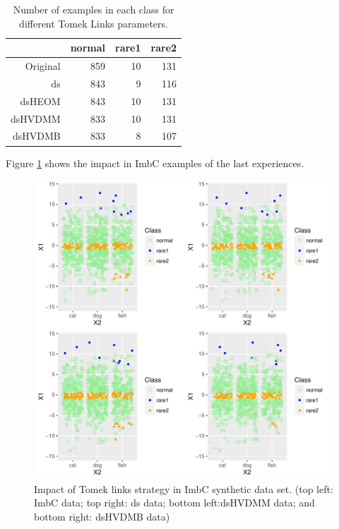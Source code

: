 \documentclass[10pt,a4paper]{article}\usepackage[]{graphicx}\usepackage[]{color}
\makeatletter
\def\maxwidth{ %
  \ifdim\Gin@nat@width>\linewidth
    \linewidth
  \else
    \Gin@nat@width
  \fi
}
\newenvironment{knitrout}{}{} %
\makeatother
\begin{document}
\begin{table}[ht]
\centering
\begin{tabular}{rrrr}
  \hline
 & normal & rare1 & rare2 \\ 
  \hline
Original & 859 &  10 & 131 \\ 
  ds & 843 &   9 & 116 \\ 
  dsHEOM & 843 &  10 & 131 \\ 
  dsHVDMM & 833 &  10 & 131 \\ 
  dsHVDMB & 833 &   8 & 107 \\ 
   \hline
\end{tabular}
\caption{Number of examples in each class for different Tomek Links parameters.} 
\label{tab:TL_table}
\end{table}



Figure \ref{fig:TL_difPar2} shows the impact in ImbC examples of the last experiences.
\begin{knitrout}\footnotesize
{}\color{fgcolor}\begin{figure}

{\centering \includegraphics[width=\maxwidth]{figures/UBL-TL_difPar2-1} 

}

\caption[Impact of Tomek links strategy in ImbC synthetic data set]{Impact of Tomek links strategy in ImbC synthetic data set. (top left: ImbC data; top right: ds data; bottom left:dsHVDMM data; and bottom right: dsHVDMB data)}\label{fig:TL_difPar2}
\end{figure}


\end{knitrout}
\end{document}
